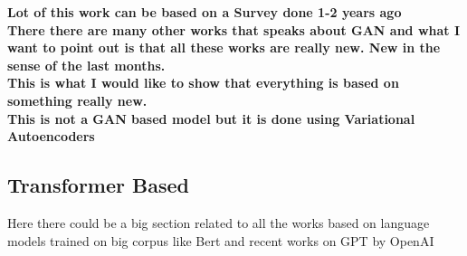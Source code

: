 \textbf{
Lot of this work can be based on a Survey done 1-2 years ago \cite{Lu} \\
There there are many other works that speaks about GAN and what I want to point out is that all these works are really new. New in the sense of the last months. \\
This is what I would like to show that everything is based on something really new. \cite{Chen} \cite{DeMasson} \cite{Dieng} \cite{Fedus2018} \cite{RelGAN} \cite{Guo} \cite{Lin2018} \cite{Wang2018} \cite{Yu2016} \cite{Zhang2017} \\
This is not a GAN based model but it is done using Variational Autoencoders \cite{Wang}
}
\subsection{Transformer Based}
Here there could be a big section related to all the works based on language models trained on big corpus like Bert and recent works on GPT by OpenAI
